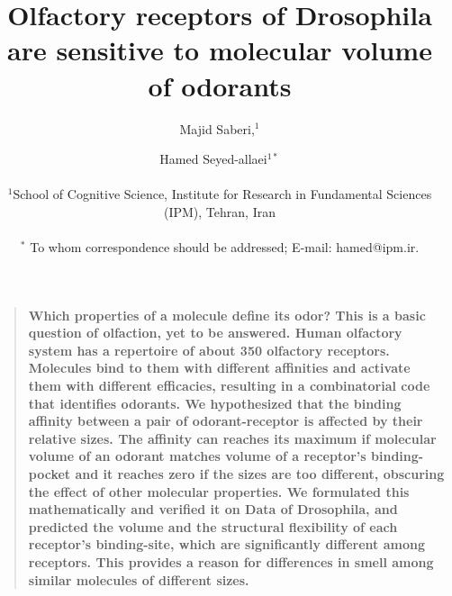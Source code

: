 \documentclass[11pt]{article} %
\title{Olfactory receptors of Drosophila are sensitive to molecular volume of odorants}
\author{Majid Saberi,$^1$ \and Hamed Seyed-allaei$^{1\ast}$\\
\\
\normalsize{$^1$School of Cognitive Science, Institute for Research in Fundamental Sciences (IPM), Tehran, Iran}\\
\\
\normalsize{$^\ast$ To whom correspondence should be addressed; E-mail:  hamed@ipm.ir.}\\
}
\newenvironment{sciabstract}{%
\begin{quote} \bf}
{\end{quote}}
\begin{document}

\maketitle

\begin{sciabstract}
	Which properties of a molecule define its odor? 
	This is a basic question of olfaction, 
	yet to be answered. Human olfactory system has a repertoire of about 350 olfactory receptors. 
	Molecules bind to them with different affinities and activate them with different efficacies, 
	resulting in a combinatorial code that identifies odorants. 
	We hypothesized that the binding affinity between a pair of odorant-receptor is affected by their relative sizes. 
	The affinity can reaches its maximum if molecular volume of an odorant matches volume of a receptor's binding-pocket 
	and it reaches zero if the sizes are too different, 
	obscuring the effect of other molecular properties. 
	We formulated this mathematically and verified it on Data of Drosophila, 
	and predicted the volume and the structural flexibility of each receptor’s binding-site, 
	which are significantly different among receptors. 
	This provides a reason for differences in smell among similar molecules of different sizes. 
\end{sciabstract}
\end{document}

